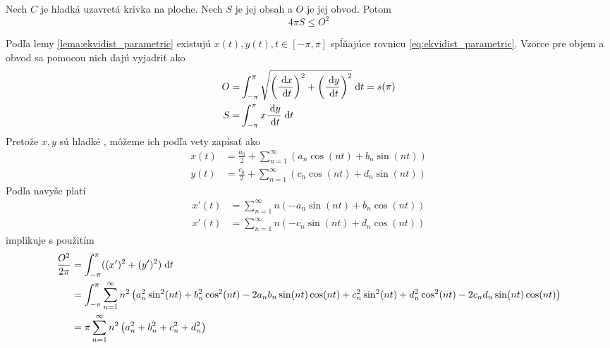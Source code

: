 \begin{veta}
Nech $C$ je hladká uzavretá krivka na ploche. Nech $S$ je jej obsah a $O$ je
jej obvod. Potom
    \begin{equation}
      4\pi S \le O^2
    \end{equation}
\end{veta}

\begin{dokaz}
    Podľa lemy \ref{lema:ekvidist_parametric} existujú
    $x(t),y(t), t\in[-\pi,\pi]$ spĺňajúce rovnicu
    \ref{eq:ekvidist_parametric}.
    Vzorce pre objem a obvod sa pomocou nich dajú vyjadriť ako
    \begin{align}        
        O =& \int_{-\pi}^{\pi} \sqrt{\left(\frac{\; \mathrm{d} x}{\; \mathrm{d} t} \right)^2 +
            \left(\frac{\; \mathrm{d} y}{\; \mathrm{d} t} \right)^2} \; \mathrm{d} t = s(\pi) \\
        S =& \int_{-\pi}^{\pi} x \frac{\; \mathrm{d} y}{\; \mathrm{d} t} \; \mathrm{d} t    
    \end{align}
    Pretože $x,y$ sú hladké , môžeme
    ich podľa vety 
    zapísať ako
    \begin{align}
        x(t) &= \frac{a_0}{2} + \sum_{n=1}^{\infty} \left(
               a_n \cos(n t) + b_n \sin(n t) \right) \\
        y(t) &= \frac{c_0}{2} + \sum_{n=1}^{\infty} \left(
               c_n \cos(n t) + d_n \sin(n t) \right)
    \end{align}
    Podľa  navyše platí
    \begin{align}
        x'(t) &= \sum_{n=1}^{\infty} n \left(
            -a_n \sin(nt) + b_n \cos(n t) \right) \\
        x'(t) &= \sum_{n=1}^{\infty} n \left(
            -c_n \sin(nt) + d_n \cos(n t) \right)
    \end{align}
     implikuje s použitím
    \begin{equation}
    \begin{split}
        \frac{O^2}{2\pi} &= \intpipi ((x')^2 + (y')^2) \dd t \\
        &=
        \intpipi \sum_{n=1}^{\infty} n^2 \left(
            a_n ^2 \sin^2(nt)+ b_n^2 \cos^2(nt)
            -2 a_n b_n \sin(nt) \cos(nt) +
            c_n ^2 \sin^2(nt)+ d_n^2 \cos^2(nt)
            -2 c_n d_n \sin(nt) \cos(nt) \right) \\
        &= \pi \sum_{n=1}^\infty n^2 \left( a_n^2 + b_n^2 + 
            c_n^2 + d_n^2 \right)
    \end{split}

\end{equation}
\end{dokaz}
